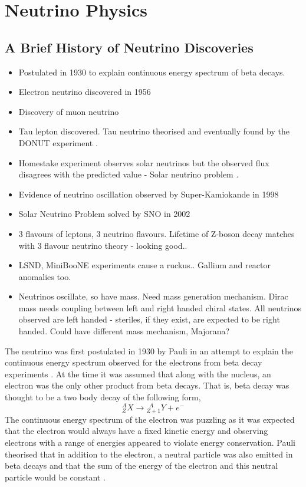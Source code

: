 \chapter{Neutrino Physics}
\label{chap:Neutrino Physics}
\section{A Brief History of Neutrino Discoveries}
\begin{itemize}
    \item Postulated in 1930 to explain continuous energy spectrum of beta decays. \cite{Pauli_letter}
    \item Electron neutrino discovered in 1956 \cite{cowan_and_reines_paper}
    \item Discovery of muon neutrino \cite{Muon_neutrino_discovery}
    \item Tau lepton discovered. Tau neutrino theorised and eventually found by the DONUT experiment \cite{DONUT}.
    \item Homestake experiment observes solar neutrinos but the observed flux disagrees with the predicted value - Solar neutrino problem \cite{Homestake}. 
    \item Evidence of neutrino oscillation observed by Super-Kamiokande in 1998 \cite{SuperK_neutrino_oscillations}
    \item Solar Neutrino Problem solved by SNO in 2002 \cite{SNO_solar_neutrinos}
    \item 3 flavours of leptons, 3 neutrino flavours. Lifetime of Z-boson decay matches with 3 flavour neutrino theory - looking good..
    \item LSND, MiniBooNE experiments cause a ruckus.. Gallium and reactor anomalies too.
    \item Neutrinos oscillate, so have mass. Need mass generation mechanism. Dirac mass needs coupling between left and right handed chiral states. All neutrinos observed are left handed - steriles, if they exist, are expected to be right handed. Could have different mass mechanism, Majorana? 
\end{itemize}


The neutrino was first postulated in 1930 by Pauli in an attempt to explain the continuous energy spectrum observed for the electrons from beta decay experiments \cite{Pauli_letter}. At the time it was assumed that along with the nucleus, an electron was the only other product from beta decays. That is, beta decay was thought to be a two body decay of the following form,
\begin{equation}
    {^A_Z}X \longrightarrow {^{\ \ A}_{Z+1}}Y + e^-
\end{equation}
The continuous energy spectrum of the electron was puzzling as it was expected that the electron would always have a fixed kinetic energy and observing electrons with a range of energies appeared to violate energy conservation. Pauli theorised that in addition to the electron, a neutral particle was also emitted in beta decays and that the sum of the energy of the electron and this neutral particle would be constant \cite{Pauli_letter}.

